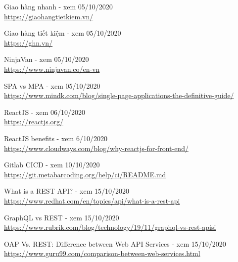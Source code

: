\documentclass[12pt,a4paper,oneside]{book}
\begin{document}
	\frontmatter
	
	
	

	\tableofcontents
	\listoffigures
	\newpage
	
	\mainmatter
	
	
	
	
    
    
    
    
    
    
    \begin{thebibliography}{80}
        
        \bibitem{} Giao hàng nhanh - xem 05/10/2020\\
        \url{https://giaohangtietkiem.vn/}
        
        \bibitem{} Giao hàng tiết kiệm - xem 05/10/2020\\
        \url{https://ghn.vn/}
        
        \bibitem{} NinjaVan - xem 05/10/2020\\
        \url{https://www.ninjavan.co/en-vn}
    
        \bibitem{} SPA vs MPA - xem 05/10/2020\\
        \url{https://www.mindk.com/blog/single-page-applications-the-definitive-guide/}
        
        \bibitem{} ReactJS - xem 06/10/2020\\
        \url{https://reactjs.org/}
    
        \bibitem{} ReactJS benefits - xem 6/10/2020\\
        \url{https://www.cloudways.com/blog/why-reactjs-for-front-end/}
    
        \bibitem{} Gitlab CICD - xem 10/10/2020\\
        \url{https://git.metabarcoding.org/help/ci/README.md}    
        
        \bibitem{} What is a REST API? - xem 15/10/2020\\
        \url{https://www.redhat.com/en/topics/api/what-is-a-rest-api} 
        
        \bibitem{} GraphQL vs REST - xem 15/10/2020\\
        \url{https://www.rubrik.com/blog/technology/19/11/graphql-vs-rest-apisi} 
        
        \bibitem{} OAP Vs. REST: Difference between Web API Services - xem 15/10/2020\\
        \url{https://www.guru99.com/comparison-between-web-services.html}  
        

\end{thebibliography}
\end{document}
